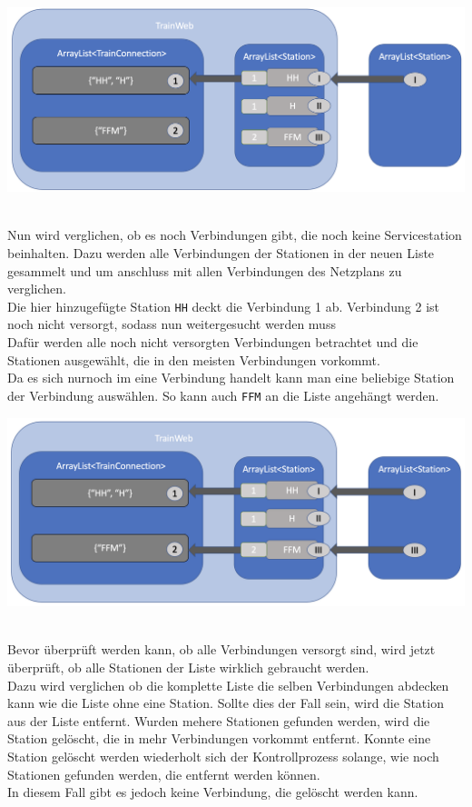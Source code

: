 \begin{center}
    \includegraphics[width=\linewidth]{images/Programmdurchlauf/Datenstruktur04.png}
    \label{test:subsecpar:datenstruktur04}
\end{center}
\\
Nun wird verglichen, ob es noch Verbindungen gibt, die noch keine Servicestation beinhalten. Dazu werden alle Verbindungen der Stationen in der neuen Liste gesammelt und um anschluss mit allen Verbindungen des Netzplans zu verglichen.\\
Die hier hinzugefügte Station \texttt{HH} deckt die Verbindung 1 ab. Verbindung 2 ist noch nicht versorgt, sodass nun weitergesucht werden muss\\
Dafür werden alle noch nicht versorgten Verbindungen betrachtet und die Stationen ausgewählt, die in den meisten Verbindungen vorkommt.\\
Da es sich nurnoch im eine Verbindung handelt kann man eine beliebige Station der Verbindung auswählen. So kann auch \texttt{FFM} an die Liste angehängt werden.\\

\begin{center}
    \includegraphics[width=\linewidth]{images/Programmdurchlauf/Datenstruktur05.png}
    \label{test:subsecpar:datenstruktur05}
\end{center}
\\
Bevor überprüft werden kann, ob alle Verbindungen versorgt sind, wird jetzt überprüft, ob alle Stationen der Liste wirklich gebraucht werden.\\
Dazu wird verglichen ob die komplette Liste die selben Verbindungen abdecken kann wie die Liste ohne eine Station. Sollte dies der Fall sein, wird die Station aus der Liste entfernt. Wurden mehere Stationen gefunden werden, wird die Station gelöscht, die in mehr Verbindungen vorkommt entfernt. Konnte eine Station gelöscht werden wiederholt sich der Kontrollprozess solange, wie noch Stationen gefunden werden, die entfernt werden können.\\
In diesem Fall gibt es jedoch keine Verbindung, die gelöscht werden kann.\\

